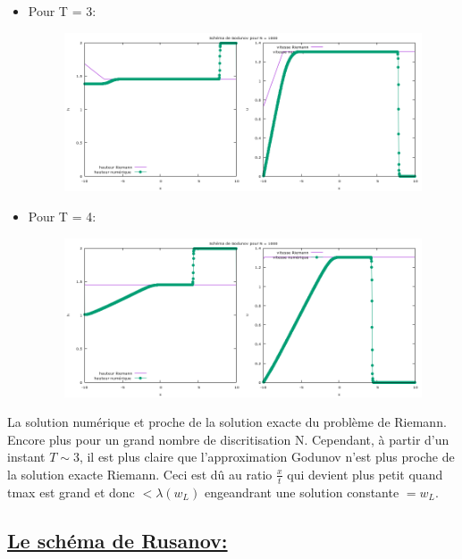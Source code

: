 \begin{itemize}
\begin{itemize}
\item Pour T = 3:

\begin{figure}[h!]
	\centering \includegraphics[scale=0.5]{Images_Fichiers/tp2godu1000_3.png}
\end{figure}

\newpage
\item Pour T = 4:

\begin{figure}[h!]
	\centering \includegraphics[scale=0.5]{Images_Fichiers/tp2godu1000_4.png}
\end{figure}

\end{itemize}


\end{itemize}

La solution num\'erique et proche de la solution exacte du probl\`eme de Riemann. Encore plus pour un grand nombre de discritisation N. Cependant, \`a partir d'un instant $T \sim 3$, il est plus claire que l'approximation Godunov n'est plus proche de la solution exacte Riemann. Ceci est d\^u au ratio $\frac{x}{t}$ qui devient plus petit quand tmax est grand et donc $< \lambda (w_L)$ engeandrant une solution constante $=w_L$.

\subsection[Le sch\'ema de Rusanov]{\uline{Le sch\'ema de Rusanov:}}

